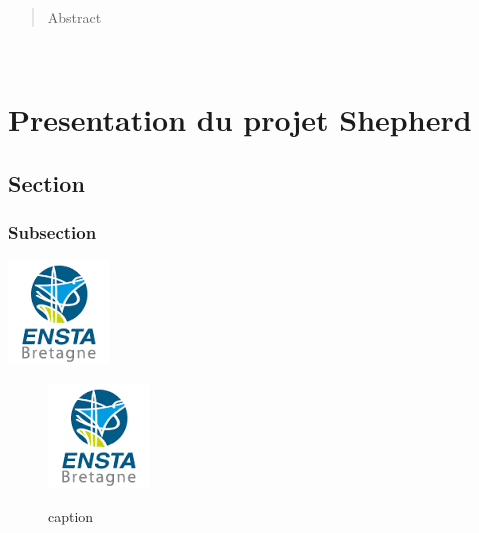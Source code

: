 \documentclass[a4paper]{report}
\begin{document}
\newpage
~
\thispagestyle{empty}
\newpage

\begin{abstract}

	Abstract

\end{abstract}

\tableofcontents

\newpage

\listoffigures
\thispagestyle{empty}
\setcounter{page}{0}

\newpage

\renewcommand{\arraystretch}{1.5}


~
\thispagestyle{empty}
\setcounter{page}{0}
\newpage

\chapter{Presentation du projet Shepherd}
\section{Section}
\subsection{Subsection}

	\begin{center}
		\includegraphics[scale=0.5]{image/logo_ensta.png}
	\end{center}

	\begin{figure}[!h]
		\centering
		\includegraphics[scale=0.5]{image/logo_ensta.png}\\
		\caption{caption}
	\end{figure} %
\end{document}
